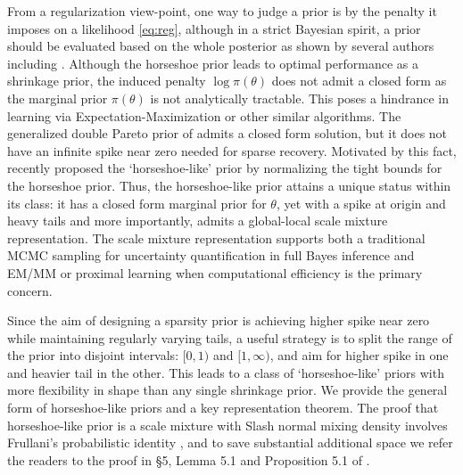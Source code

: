 \documentclass[sts,preprint]{imsart}
\begin{document}
From a regularization view-point, one way to judge a prior is by the penalty it imposes on a likelihood \eqref{eq:reg}, although in a strict Bayesian spirit, a prior should be evaluated based on the whole posterior as shown by several authors including \citep{castillo2015bayesian, van2017adaptive}. %
Although the horseshoe prior leads to optimal performance as a shrinkage prior, the induced penalty $\log \pi(\theta)$ does not admit a closed form as the marginal prior $\pi(\theta)$ is not analytically tractable. This poses a hindrance in learning via Expectation-Maximization or other similar algorithms.  The generalized double Pareto prior of
\citet{armagan2011generalized} admits a closed form solution, but it does not have an infinite spike near zero needed for sparse recovery. Motivated by this fact, \citet{bhadra2017horseshoe} recently proposed the `horseshoe-like' prior by normalizing the tight bounds for the horseshoe prior. Thus, the horseshoe-like
prior attains a unique status within its class: it has a closed form marginal prior for $\theta$, yet with a spike at origin and heavy tails and more importantly, admits a global-local scale mixture representation. The scale mixture representation supports both a traditional MCMC sampling for uncertainty
quantification in full Bayes inference and EM/MM or proximal learning when computational efficiency is the primary concern. 

Since the aim of designing a sparsity prior is achieving higher spike near zero while maintaining regularly varying tails, a useful strategy is to split the range of the prior into disjoint intervals: $[0,1)$ and $[1, \infty)$, and aim for higher spike in one and heavier tail in the other. This leads to a class of `horseshoe-like' priors with more flexibility in shape than any single shrinkage prior. We provide the
general form of horseshoe-like priors and a key representation theorem.  The proof that horseshoe-like prior is a scale mixture with Slash normal mixing density involves Frullani's probabilistic identity \citep[\textit{vide}][pages 406-407]{jeffreys1972methods}, and to save substantial additional space we refer the readers to the proof in \S 5, Lemma 5.1 and Proposition 5.1 of \citet{bhadra2017horseshoe}.
\end{document}
